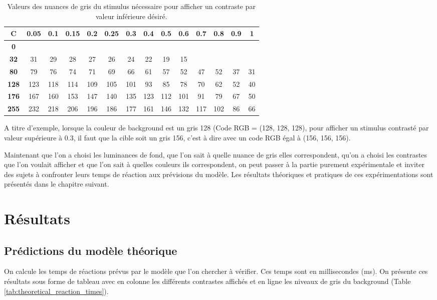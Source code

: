 	\begin{table}[h]	
		\centering
		\caption{Valeurs des nuances de gris du stimulus nécessaire pour afficher un contraste par valeur inférieure désiré.}
		\label{tab:contraste_inf}
		\begin{tabular}{c|ccccccccccccc}
			\textbf{C} & \textbf{0.05} & \textbf{0.1} & \textbf{0.15} & \textbf{0.2} & \textbf{0.25} & \textbf{0.3} & \textbf{0.4} & \textbf{0.5} & \textbf{0.6} & \textbf{0.7} & \textbf{0.8} & \textbf{0.9} & \textbf{1}\\
			\hline
			\textbf{0}\\
			\textbf{32} & 31 & 29 & 28 & 27 & 26 & 24 & 22 & 19 & 15\\
			\textbf{80} & 79 & 76 & 74 & 71 & 69 & 66 & 61 & 57 & 52 & 47 & 52 & 37 & 31\\
			\textbf{128} & 123 & 118 & 114 & 109 & 105 & 101 & 93 & 85 & 78 & 70 & 62 & 52 & 40\\
			\textbf{176} & 167 & 160 & 153 & 147 & 140 & 135 & 123 & 112 & 101 & 91 & 79 & 67 & 50\\
			\textbf{255} & 232 & 218 & 206 & 196 & 186 & 177 & 161 & 146 & 132 & 117 & 102 & 86 & 66\\
		\end{tabular}
	\end{table}
	
	\par A titre d'exemple, lorsque la couleur de background est un gris 128 (Code RGB = (128, 128, 128), pour afficher un stimulus contrasté par valeur supérieure à 0.3, il faut que la cible soit un gris 156, c'est à dire avec un code RGB égal à (156, 156, 156). 
	
	\par Maintenant que l'on a choisi les luminances de fond, que l'on sait à quelle nuance de gris elles correspondent, qu'on a choisi les contrastes que l'on voulait afficher et que l'on sait à quelles couleurs ils correspondent, on peut passer à la partie purement expérimentale et inviter des sujets à confronter leurs temps de réaction aux prévisions du modèle. Les résultats théoriques et pratiques de ces expérimentations sont présentés dans le chapitre suivant.
	
\chapter{Résultats}
	\section{Prédictions du modèle théorique}
	\par On calcule les temps de réactions prévus par le modèle que l'on chercher à vérifier. Ces temps sont en millisecondes (ms). On présente ces résultats sous forme de tableau avec en colonne les différents contrastes affichés et en ligne les niveaux de gris du background (Table \ref{tab:theoretical_reaction_times}).
	
